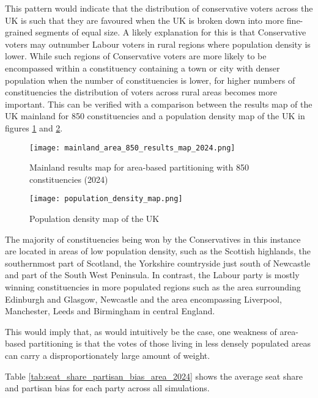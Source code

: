 \documentclass{article}
\begin{document}
This pattern would indicate that the distribution of conservative voters across the UK is such that they are favoured when the UK is broken down into more 
fine-grained segments of equal size. A likely explanation for this is that Conservative voters may outnumber Labour voters in rural regions where population
density is lower. While such regions of Conservative voters are more likely to be encompassed within a constituency containing a town or city with denser population when
the number of constituencies is lower, for higher numbers of constituencies the distribution of voters across rural areas becomes more important. This can be verified
with a comparison between the results map of the UK mainland for 850 constituencies and a population density map of the UK in figures \ref{fig:mainland_area_850_results_map} and \ref{fig:population_density_map}.

\begin{figure}[H]
    \centering
    \texttt{[image: mainland\_area\_850\_results\_map\_2024.png]}
    \caption{Mainland results map for area-based partitioning with 850 constituencies (2024)}
    \label{fig:mainland_area_850_results_map}
\end{figure}

\begin{figure}[H]
    \centering
    \texttt{[image: population\_density\_map.png]}
    \caption{Population density map of the UK \cite{popdensity}}
    \label{fig:population_density_map}
\end{figure}

The majority of constituencies being won by the Conservatives in this instance are located in areas of low population density, such as the Scottish highlands, the southernmost part of Scotland,
the Yorkshire countryside just south of Newcastle and part of the South West Peninsula. In contrast, the Labour party is mostly winning constituencies in more populated regions such as the area 
surrounding Edinburgh and Glasgow, Newcastle and the area encompassing Liverpool, Manchester, Leeds and Birmingham in central England.

This would imply that, as would intuitively be the case, one weakness of area-based partitioning is that the votes of those living in less densely populated areas can carry a disproportionately
large amount of weight.

Table \ref{tab:seat_share_partisan_bias_area_2024} shows the average seat share and partisan bias for each party across all simulations.
\end{document}

